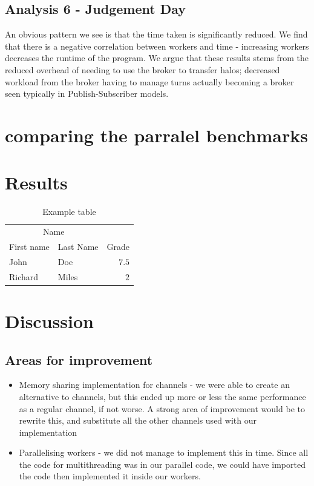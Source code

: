 \documentclass[twoside,twocolumn]{article}
\begin{document}
\subsection{Analysis 6 - Judgement Day}
An obvious pattern we see is that the time taken is significantly reduced. We find that there is a negative
correlation between workers and time - increasing workers decreases the runtime of the program. We argue that
these results stems from the reduced overhead of needing to use the broker to transfer halos; decreased workload
from the broker having to manage turns actually becoming a broker seen typically in Publish-Subscriber models.


\section{comparing the parralel benchmarks}




\section{Results}

\begin{table}
\caption{Example table}
\centering
\begin{tabular}{llr}
\toprule
\multicolumn{2}{c}{Name} \\
\cmidrule(r){1-2}
First name & Last Name & Grade \\
\midrule
John & Doe & $7.5$ \\
Richard & Miles & $2$ \\
\bottomrule
\end{tabular}
\end{table}



\section{Discussion}

\subsection{Areas for improvement}

\begin{itemize}
  \item Memory sharing implementation for channels - we were able to create an alternative to channels, but
  this ended up more or less the same performance as a regular channel, if not worse. A strong area of improvement
  would be to rewrite this, and substitute all the other channels used with our implementation
  \item Parallelising workers - we did not manage to implement this in time. Since all the code for multithreading
  was in our parallel code, we could have imported the code then implemented it inside our workers.
\end{itemize}
\end{document}
